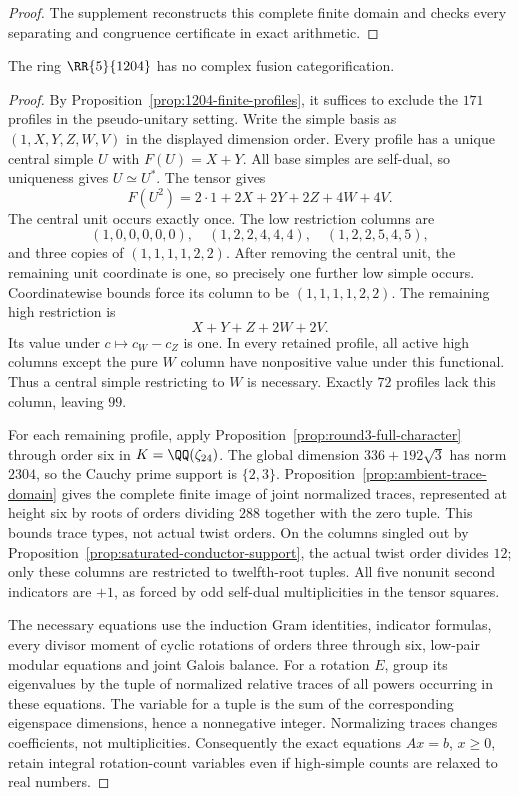 \begin{proof}
The supplement reconstructs this complete finite domain and checks every
separating and congruence certificate in exact arithmetic.
\end{proof}

\begin{theorem}\label{thm:1204-excluded}
The ring $\RR{5}{1204}$ has no complex fusion categorification.
\end{theorem}
\begin{proof}
By Proposition~\ref{prop:1204-finite-profiles}, it suffices to exclude the
$171$ profiles in the pseudo-unitary setting. Write the simple basis as
$(1,X,Y,Z,W,V)$ in the displayed dimension order. Every profile has a
unique central simple $U$ with $F(U)=X+Y$. All base simples are self-dual,
so uniqueness gives $U\simeq U^*$. The tensor gives
\[
 F(U^2)=2\cdot1+2X+2Y+2Z+4W+4V.
\]
The central unit occurs exactly once. The low restriction columns are
\[
 (1,0,0,0,0,0),\quad(1,2,2,4,4,4),\quad(1,2,2,5,4,5),
\]
and three copies of $(1,1,1,1,2,2)$. After removing the central unit,
the remaining unit coordinate is one, so precisely one further low
simple occurs. Coordinatewise bounds force its column to be
$(1,1,1,1,2,2)$. The remaining high restriction is
\[
 X+Y+Z+2W+2V.
\]
Its value under $c\mapsto c_W-c_Z$ is one. In every retained profile,
all active high columns except the pure $W$ column have nonpositive
value under this functional. Thus a central simple restricting to $W$
is necessary. Exactly $72$ profiles lack this column, leaving $99$.

For each remaining profile, apply
Proposition~\ref{prop:round3-full-character} through order six in
$K=\QQ(\zeta_{24})$. The global dimension $336+192\sqrt3$ has norm
$2304$, so the Cauchy prime support is $\{2,3\}$.
Proposition~\ref{prop:ambient-trace-domain} gives the complete finite
image of joint normalized traces, represented at height six by roots
of orders dividing $288$ together with the zero tuple. This bounds
trace types, not actual twist orders. On the columns singled out by
Proposition~\ref{prop:saturated-conductor-support}, the actual twist
order divides $12$; only these columns are restricted to twelfth-root
tuples. All five nonunit second indicators are $+1$, as forced by
odd self-dual multiplicities in the tensor squares.

The necessary equations use the induction Gram identities, indicator
formulas, every divisor moment of cyclic rotations of orders three
through six, low-pair modular equations and joint Galois balance.
For a rotation $E$, group its eigenvalues by the tuple of normalized
relative traces of all powers occurring in these equations. The
variable for a tuple is the sum of the corresponding eigenspace
dimensions, hence a nonnegative integer. Normalizing traces changes
coefficients, not multiplicities. Consequently the exact equations
$Ax=b$, $x\ge0$, retain integral rotation-count variables even if
high-simple counts are relaxed to real numbers.


\end{proof}
